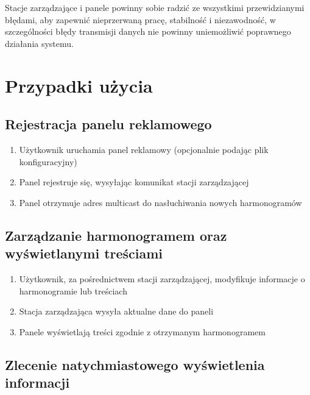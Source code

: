 \documentclass[12pt, a4paper]{article}
\providecommand{\tightlist}{%
  \setlength{\itemsep}{0pt}\setlength{\parskip}{0pt}}
\begin{document}
Stacje zarządzające i panele powinny sobie radzić ze wszystkimi
przewidzianymi błędami, aby zapewnić nieprzerwaną pracę, stabilność i
niezawodność, w szczególności błędy transmisji danych nie powinny
uniemożliwić poprawnego działania systemu.

\hypertarget{przypadki-uux17cycia}{%
\section{Przypadki użycia}\label{przypadki-uux17cycia}}

\hypertarget{rejestracja-panelu-reklamowego}{%
\subsection{Rejestracja panelu reklamowego}\label{rejestracja-panelu-reklamowego}}

\begin{enumerate}
\def\labelenumi{\arabic{enumi}.}
\tightlist
\item
  Użytkownik uruchamia panel reklamowy (opcjonalnie podając plik
  konfiguracyjny)
\item
  Panel rejestruje się, wysyłając komunikat stacji zarządzającej
\item
  Panel otrzymuje adres multicast do nasłuchiwania nowych harmonogramów
\end{enumerate}

\hypertarget{zarzux105dzanie-harmonogramem-oraz-wyux15bwietlanymi-treux15bciami}{%
\subsection{Zarządzanie harmonogramem oraz wyświetlanymi treściami}\label{zarzux105dzanie-harmonogramem-oraz-wyux15bwietlanymi-treux15bciami}}

\begin{enumerate}
\def\labelenumi{\arabic{enumi}.}
\tightlist
\item
  Użytkownik, za pośrednictwem stacji zarządzającej, modyfikuje
  informacje o harmonogramie lub treściach
\item
  Stacja zarządzająca wysyła aktualne dane do paneli
\item
  Panele wyświetlają treści zgodnie z otrzymanym harmonogramem
\end{enumerate}

\hypertarget{zlecenie-natychmiastowego-wyux15bwietlenia-informacji}{%
\subsection{Zlecenie natychmiastowego wyświetlenia informacji}\label{zlecenie-natychmiastowego-wyux15bwietlenia-informacji}}
\end{document}
